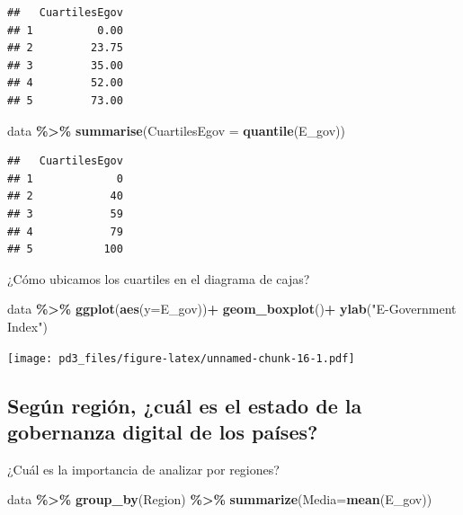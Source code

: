 \documentclass[
]{article}
\newenvironment{Shaded}{\begin{snugshade}}{\end{snugshade}}
\newcommand{\AttributeTok}[1]{\textcolor[rgb]{0.13,0.29,0.53}{#1}}
\newcommand{\FunctionTok}[1]{\textcolor[rgb]{0.13,0.29,0.53}{\textbf{#1}}}
\newcommand{\NormalTok}[1]{#1}
\newcommand{\SpecialCharTok}[1]{\textcolor[rgb]{0.81,0.36,0.00}{\textbf{#1}}}
\newcommand{\StringTok}[1]{\textcolor[rgb]{0.31,0.60,0.02}{#1}}
\begin{document}
\begin{verbatim}
##   CuartilesEgov
## 1          0.00
## 2         23.75
## 3         35.00
## 4         52.00
## 5         73.00
\end{verbatim}

\begin{Shaded}
\begin{Highlighting}[]
\NormalTok{data }\SpecialCharTok{\%\textgreater{}\%} 
  \FunctionTok{summarise}\NormalTok{(}\AttributeTok{CuartilesEgov =} \FunctionTok{quantile}\NormalTok{(E\_gov))}
\end{Highlighting}
\end{Shaded}

\begin{verbatim}
##   CuartilesEgov
## 1             0
## 2            40
## 3            59
## 4            79
## 5           100
\end{verbatim}

¿Cómo ubicamos los cuartiles en el diagrama de cajas?

\begin{Shaded}
\begin{Highlighting}[]
\NormalTok{data }\SpecialCharTok{\%\textgreater{}\%} 
  \FunctionTok{ggplot}\NormalTok{(}\FunctionTok{aes}\NormalTok{(}\AttributeTok{y=}\NormalTok{E\_gov))}\SpecialCharTok{+}
  \FunctionTok{geom\_boxplot}\NormalTok{()}\SpecialCharTok{+}
  \FunctionTok{ylab}\NormalTok{(}\StringTok{"E{-}Government Index"}\NormalTok{)}
\end{Highlighting}
\end{Shaded}

\texttt{[image: pd3\_files/figure-latex/unnamed-chunk-16-1.pdf]}

\hypertarget{seguxfan-regiuxf3n-cuuxe1l-es-el-estado-de-la-gobernanza-digital-de-los-pauxedses}{%
\subsection{\texorpdfstring{\textbf{Según región, ¿cuál es el estado de
la gobernanza digital de los
países?}}{Según región, ¿cuál es el estado de la gobernanza digital de los países?}}\label{seguxfan-regiuxf3n-cuuxe1l-es-el-estado-de-la-gobernanza-digital-de-los-pauxedses}}

¿Cuál es la importancia de analizar por regiones?

\begin{Shaded}
\begin{Highlighting}[]
\NormalTok{data }\SpecialCharTok{\%\textgreater{}\%}
 \FunctionTok{group\_by}\NormalTok{(Region) }\SpecialCharTok{\%\textgreater{}\%}
  \FunctionTok{summarize}\NormalTok{(}\AttributeTok{Media=}\FunctionTok{mean}\NormalTok{(E\_gov)) }
\end{Highlighting}
\end{Shaded}
\end{document}
